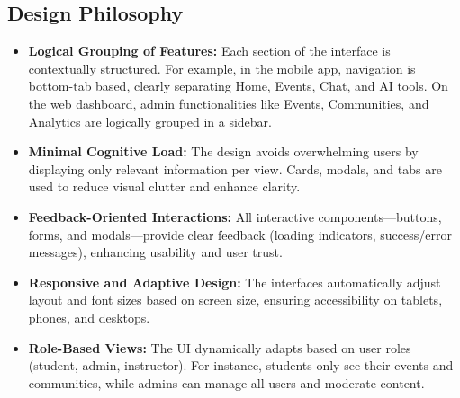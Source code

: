 \subsection*{Design Philosophy}
\begin{itemize}
    \item \textbf{Logical Grouping of Features:} Each section of the interface is contextually structured. For example, in the mobile app, navigation is bottom-tab based, clearly separating Home, Events, Chat, and AI tools. On the web dashboard, admin functionalities like Events, Communities, and Analytics are logically grouped in a sidebar.
    
    \item \textbf{Minimal Cognitive Load:} The design avoids overwhelming users by displaying only relevant information per view. Cards, modals, and tabs are used to reduce visual clutter and enhance clarity.
    
    \item \textbf{Feedback-Oriented Interactions:} All interactive components—buttons, forms, and modals—provide clear feedback (loading indicators, success/error messages), enhancing usability and user trust.
    
    \item \textbf{Responsive and Adaptive Design:} The interfaces automatically adjust layout and font sizes based on screen size, ensuring accessibility on tablets, phones, and desktops.
    
    \item \textbf{Role-Based Views:} The UI dynamically adapts based on user roles (student, admin, instructor). For instance, students only see their events and communities, while admins can manage all users and moderate content.
\end{itemize}


